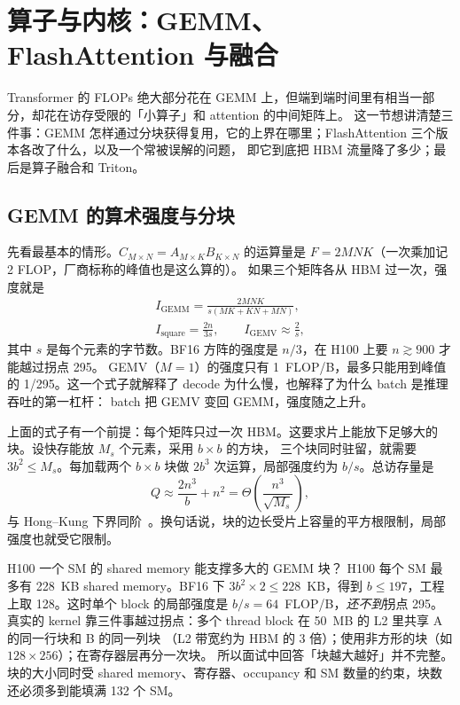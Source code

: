 \section{算子与内核：GEMM、FlashAttention 与融合}
\label{sec:kernel}

Transformer 的 FLOPs 绝大部分花在 GEMM 上，但端到端时间里有相当一部分，却花在访存受限的「小算子」和 attention 的中间矩阵上。
这一节想讲清楚三件事：GEMM 怎样通过分块获得复用，它的上界在哪里；FlashAttention 三个版本各改了什么，以及一个常被误解的问题，
即它到底把 HBM 流量降了多少；最后是算子融合和 Triton。

\subsection{GEMM 的算术强度与分块}

先看最基本的情形。$C_{M\times N}=A_{M\times K}B_{K\times N}$ 的运算量是 $F=2MNK$（一次乘加记 2 FLOP，厂商标称的峰值也是这么算的）。
如果三个矩阵各从 HBM 过一次，强度就是
\begin{equation}
\begin{gathered}
I_{\text{GEMM}} = \frac{2MNK}{s(MK+KN+MN)},\\
I_{\text{square}} = \frac{2n}{3s},\qquad
I_{\text{GEMV}} \approx \frac{2}{s},
\end{gathered}
\end{equation}
其中 $s$ 是每个元素的字节数。BF16 方阵的强度是 $n/3$，在 H100 上要 $n\gtrsim 900$ 才能越过拐点 295。
GEMV（$M=1$）的强度只有 1~FLOP/B，最多只能用到峰值的 1/295。这一个式子就解释了 decode 为什么慢，也解释了为什么 batch 是推理吞吐的第一杠杆：
batch 把 GEMV 变回 GEMM，强度随之上升。

上面的式子有一个前提：每个矩阵只过一次 HBM。这要求片上能放下足够大的块。设快存能放 $M_s$ 个元素，采用 $b\times b$ 的方块，
三个块同时驻留，就需要 $3b^2\le M_s$。每加载两个 $b\times b$ 块做 $2b^3$ 次运算，局部强度约为 $b/s$。总访存量是
\begin{equation}
Q \approx \frac{2n^3}{b}+n^2 = \Theta\!\left(\frac{n^3}{\sqrt{M_s}}\right),
\end{equation}
与 Hong--Kung 下界同阶~\cite{hong1981io}。换句话说，块的边长受片上容量的平方根限制，局部强度也就受它限制。

\begin{est}{H100 一个 SM 的 shared memory 能支撑多大的 GEMM 块？}
H100 每个 SM 最多有 228~KB shared memory。BF16 下 $3b^2\times2\le228$~KB，得到 $b\le197$，工程上取 128。这时单个 block 的局部强度是
$b/s=64$~FLOP/B，\emph{还不到}拐点 295。真实的 kernel 靠三件事越过拐点：多个 thread block 在 50~MB 的 L2 里共享 A 的同一行块和 B 的同一列块
（L2 带宽约为 HBM 的 3 倍）；使用非方形的块（如 $128\times256$）；在寄存器层再分一次块。
所以面试中回答「块越大越好」并不完整。块的大小同时受 shared memory、寄存器、occupancy 和 SM 数量的约束，块数还必须多到能填满 132 个 SM。
\end{est}

